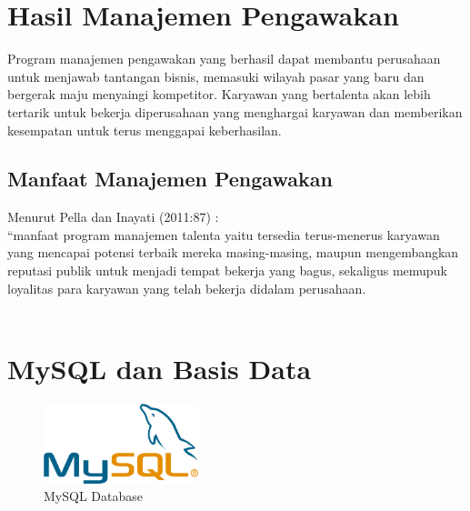 \section{Hasil Manajemen Pengawakan}

Program manajemen pengawakan yang berhasil dapat membantu perusahaan untuk menjawab tantangan bisnis, memasuki wilayah pasar yang baru dan bergerak maju menyaingi kompetitor. Karyawan yang bertalenta akan lebih tertarik untuk bekerja diperusahaan yang menghargai karyawan dan memberikan kesempatan untuk terus menggapai keberhasilan.

\subsection{Manfaat Manajemen Pengawakan}

Menurut Pella dan Inayati (2011:87) \cite{4}: \\
“manfaat program manajemen talenta yaitu tersedia terus-menerus karyawan yang mencapai potensi terbaik mereka masing-masing, maupun mengembangkan reputasi publik untuk menjadi tempat bekerja yang bagus, sekaligus memupuk loyalitas para karyawan yang telah bekerja didalam perusahaan.
\\
\\

\section{MySQL dan Basis Data}

\begin{figure}
	\centering
	\includegraphics[width=0.4\textwidth]
	{pics/mysql.png}
	\caption{MySQL Database}
	\label{fig:31}
\end{figure}

